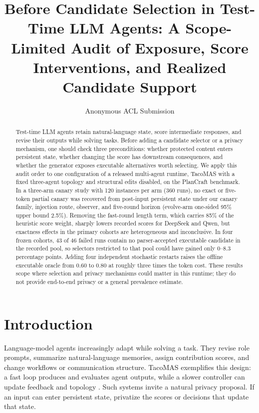 \documentclass[11pt]{article}
\title{Before Candidate Selection in Test-Time LLM Agents: A Scope-Limited Audit of Exposure, Score Interventions, and Realized Candidate Support}
\author{Anonymous ACL Submission}
\begin{document}
\maketitle

\begin{abstract}
Test-time LLM agents retain natural-language state, score intermediate responses, and revise their outputs while solving tasks. Before adding a candidate selector or a privacy mechanism, one should check three preconditions: whether protected content enters persistent state, whether changing the score has downstream consequences, and whether the generator exposes executable alternatives worth selecting. We apply this audit order to one configuration of a released multi-agent runtime, TacoMAS with a fixed three-agent topology and structural edits disabled, on the PlanCraft benchmark. In a three-arm canary study with 120 instances per arm (360 runs), no exact or five-token partial canary was recovered from post-input persistent state under our canary family, injection route, observer, and five-round horizon (evolve-arm one-sided 95\% upper bound 2.5\%). Removing the fast-round length term, which carries 85\% of the heuristic score weight, sharply lowers recorded scores for DeepSeek and Qwen, but exactness effects in the primary cohorts are heterogeneous and inconclusive. In four frozen cohorts, 43 of 46 failed runs contain no parser-accepted executable candidate in the recorded pool, so selectors restricted to that pool could have gained only 0--8.3 percentage points. Adding four independent stochastic restarts raises the offline executable oracle from 0.60 to 0.80 at roughly three times the token cost. These results scope where selection and privacy mechanisms could matter in this runtime; they do not provide end-to-end privacy or a general prevalence estimate.
\end{abstract}

\section{Introduction}

Language-model agents increasingly adapt while solving a task. They revise role prompts, summarize natural-language memories, assign contribution scores, and change workflows or communication structure. TacoMAS exemplifies this design: a fast loop produces and evaluates agent outputs, while a slower controller can update feedback and topology \citep{xu2026tacomas}. Such systems invite a natural privacy proposal. If an input can enter persistent state, privatize the scores or decisions that update that state.
\end{document}
